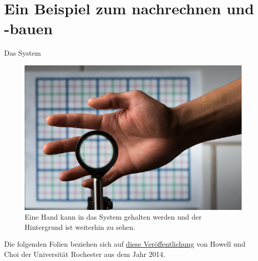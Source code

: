 \section{Ein Beispiel zum nachrechnen und -bauen}

\begin{frame}{Das System}
  \begin{figure}
    \caption{Eine Hand kann in das System gehalten werden und der Hintergrund ist weiterhin zu sehen.}
    \centering
    \includegraphics[height=0.6\textheight]{images/hand-cloak.jpg}
  \end{figure}
  Die folgenden Folien beziehen sich auf
  \href{https://www.rochester.edu/newscenter/watch-rochester-cloak-uses-ordinary-lenses-to-hide-objects-across-continuous-range-of-angles-70592/}{diese Veröffentlichung}
  von Howell und Choi der Universität Rochester aus dem Jahr 2014.
\end{frame}

